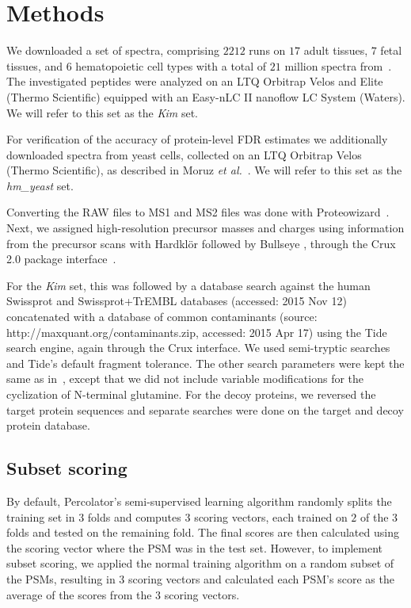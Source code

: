 \documentclass{article}
\begin{document}
\section*{Methods}

We downloaded a set of spectra, comprising $2212$ runs on $17$ adult
tissues, $7$ fetal tissues, and $6$ hematopoietic cell types with a
total of $21$ million spectra from~\cite{kim2014draft}. The
investigated peptides were analyzed on an LTQ Orbitrap Velos and Elite
(Thermo Scientific) equipped with an Easy-nLC II nanoflow LC System
(Waters). We will refer to this set as the {\em Kim} set.

For verification of the accuracy of protein-level FDR estimates we
additionally downloaded spectra from yeast cells, collected on an LTQ
Orbitrap Velos (Thermo Scientific), as described in Moruz {\em et 
al.}~\cite{moruz2013}. We will refer to this set as the {\em
hm\_yeast} set.

Converting the RAW files to MS1 and MS2 files was done with
Proteowizard~\cite{kessner2008}. Next, we assigned high-resolution
precursor masses and charges using information from the precursor
scans with Hardkl\"{o}r \cite{hoopmann2007} followed by Bullseye
\cite{hsieh2009}, through the Crux 2.0 package
interface~\cite{mcilwain2014}. 

For the {\em Kim} set, this was followed by a database search against
the human Swissprot and Swissprot+TrEMBL databases (accessed: 2015 Nov
12) concatenated with a database of common contaminants (source:
http://maxquant.org/contaminants.zip, accessed: 2015 Apr 17) using the
Tide search engine, again through the Crux interface. We used
semi-tryptic searches and Tide's default fragment tolerance. The other
search parameters were kept the same as in~\cite{kim2014draft}, except
that we did not include variable modifications for the cyclization of
N-terminal glutamine. For the decoy proteins, we reversed the target
protein sequences and separate searches were done on the target and
decoy protein database.

\subsection*{Subset scoring}

By default, Percolator's semi-supervised learning algorithm randomly
splits the training set in $3$ folds and computes $3$ scoring vectors,
each trained on $2$ of the $3$ folds and tested on the remaining fold.
The final scores are then calculated using the scoring vector where
the PSM was in the test set. However, to implement subset scoring, we
applied the normal training algorithm on a random subset of the PSMs,
resulting in $3$ scoring vectors and calculated each PSM's score as
the average of the scores from the $3$ scoring vectors.
\end{document}
